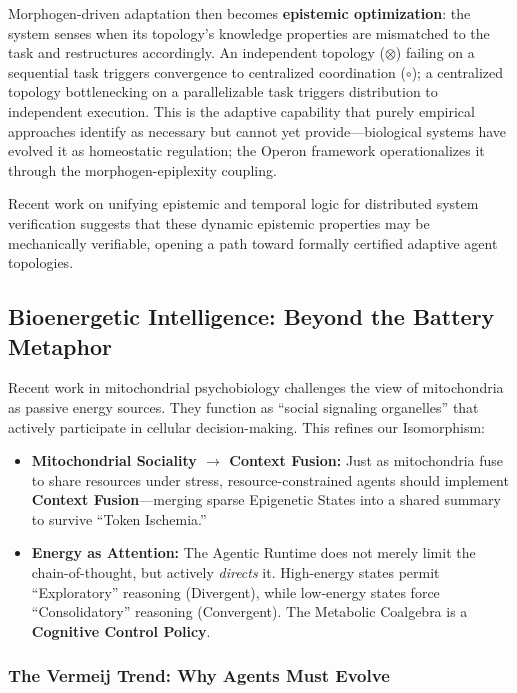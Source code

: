Morphogen-driven adaptation then becomes \textbf{epistemic optimization}: the system senses when its topology's knowledge properties are mismatched to the task and restructures accordingly. An independent topology ($\otimes$) failing on a sequential task triggers convergence to centralized coordination ($\circ$); a centralized topology bottlenecking on a parallelizable task triggers distribution to independent execution. This is the adaptive capability that purely empirical approaches \cite{kim2025scaling} identify as necessary but cannot yet provide---biological systems have evolved it as homeostatic regulation; the Operon framework operationalizes it through the morphogen-epiplexity coupling.

Recent work on unifying epistemic and temporal logic for distributed system verification \cite{davis2026reasoning} suggests that these dynamic epistemic properties may be mechanically verifiable, opening a path toward formally certified adaptive agent topologies.

\subsection{Bioenergetic Intelligence: Beyond the Battery Metaphor}

Recent work in mitochondrial psychobiology \cite{allen2022energy, picard2022signaling} challenges the view of
mitochondria as passive energy sources. They function as ``social signaling organelles'' that actively participate
in cellular decision-making. This refines our Isomorphism:
\begin{itemize}[leftmargin=*]
\item \textbf{Mitochondrial Sociality $\to$ Context Fusion:} Just as mitochondria fuse to share resources under
stress, resource-constrained agents should implement \textbf{Context Fusion}---merging sparse Epigenetic States
into a shared summary to survive ``Token Ischemia.''
\item \textbf{Energy as Attention:} The Agentic Runtime does not merely limit the chain-of-thought, but actively
\textit{directs} it. High-energy states permit ``Exploratory'' reasoning (Divergent), while low-energy states
force ``Consolidatory'' reasoning (Convergent). The Metabolic Coalgebra is a \textbf{Cognitive Control Policy}.
\end{itemize}

\subsubsection{The Vermeij Trend: Why Agents Must Evolve}

